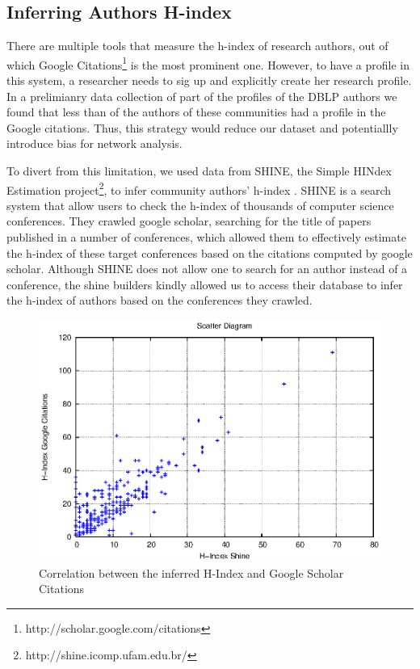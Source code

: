 \subsection{Inferring Authors H-index}
\label{sub:hindex}

There are multiple tools that measure the h-index of research authors, out of which Google Citations\footnote{http://scholar.google.com/citations} is the most prominent one.
However, to have a profile in this system, a researcher needs to sig up and explicitly create her research profile.  In a prelimianry data collection of part of the profiles of the
DBLP  authors we found that less than  of the authors of these communities had a profile in the Google
citations. Thus, this strategy would reduce our dataset and potentiallly introduce bias for network analysis. 

To divert from this limitation,  we used data from SHINE, the Simple HINdex Estimation project\footnote{http://shine.icomp.ufam.edu.br/}, to infer community authors' h-index  .
SHINE is a search system that allow users to check the h-index of thousands of computer science conferences. They crawled google scholar, searching for the title of papers
published in a number of conferences, which allowed them to effectively estimate the h-index of these target conferences based on the citations computed by google scholar.
Although SHINE does not allow one to search for an author instead of a conference, the shine builders kindly allowed us to access their database to infer the h-index of authors
based on the conferences they crawled. 


\begin{figure}[!htb]
\centering
\includegraphics[scale=.5]{graficos/hindex/hindex_scatter_plot.eps}
\caption{Correlation between the inferred H-Index and Google Scholar Citations }
\label{fig:hindex_scatter_plot}
\end{figure}

